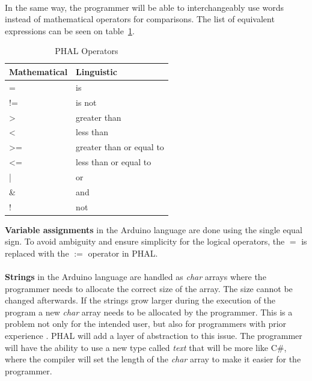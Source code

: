 \\
In the same way, the programmer will be able to interchangeably use words instead of mathematical operators for comparisons. 
The list of equivalent expressions can be seen on table~\ref{table:phaloperators}.
\begin{table}[H]
\centering
\caption{PHAL Operators} \label{LA:PhalOperators}
\label{table:phaloperators}
\begin{tabular}{|l|l|}
\hline
\textbf{Mathematical} & \textbf{Linguistic}        \\ \hline
=                   & is                               \\ \hline
!=                  & is not                           \\ \hline
\textgreater        & greater than       \\ \hline
\textless           & less than                      \\ \hline
\textgreater=        & greater than or equal to        \\ \hline
\textless=           & less than or equal to           \\ \hline
|                   & or                  \\ \hline
\&                 & and                 \\ \hline
!                    & not                 \\ \hline
\end{tabular}
\end{table}
\noindent
\textbf{Variable assignments} in the Arduino language are done using the single equal sign. 
To avoid ambiguity and ensure simplicity for the logical operators, the $=$ is replaced with the $:=$ operator in PHAL.
\\\\
\textbf{Strings} in the Arduino language are handled as \textit{char} arrays where the programmer needs to allocate the correct size of the array. 
The size cannot be changed afterwards. 
If the strings grow larger during the execution of the program a new \textit{char} array needs to be allocated by the programmer. 
This is a problem not only for the intended user, but also for programmers with prior experience \cite{FiveCommonArduinoMistakes}. 
PHAL will add a layer of abstraction to this issue. 
The programmer will have the ability to use a new type called \textit{text} that will be more like C\#, where the compiler will set the length of the \textit{char} array to make it easier for the programmer.
\\\\
